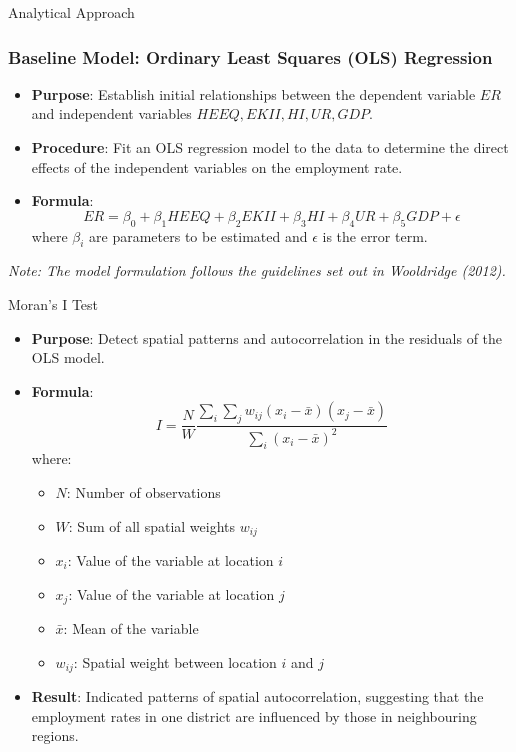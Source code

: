 \documentclass[10pt]{beamer}
\begin{document}
\begin{frame}{Analytical Approach}
\frametitle{Baseline Model: Ordinary Least Squares (OLS) Regression}
    \begin{itemize}
        \item \textbf{Purpose}: Establish initial relationships between the dependent variable \( ER \) and independent variables \( HEEQ, EKII, HI, UR, GDP \).
        \item \textbf{Procedure}: Fit an OLS regression model to the data to determine the direct effects of the independent variables on the employment rate.
        \item \textbf{Formula}:
        \begin{equation}
            ER = \beta_0 + \beta_1 HEEQ + \beta_2 EKII + \beta_3 HI + \beta_4 UR + \beta_5 GDP + \epsilon
        \end{equation}
        where \( \beta_i \) are parameters to be estimated and \( \epsilon \) is the error term.
    \end{itemize}
    \textit{Note: The model formulation follows the guidelines set out in Wooldridge (2012).}
\end{frame}


\begin{frame}{Moran's I Test \parencite{moran1950}}
    \begin{itemize}
        \item \textbf{Purpose}: Detect spatial patterns and autocorrelation in the residuals of the OLS model.
        \item \textbf{Formula}:
        \begin{equation}
            I = \frac{N}{W} \frac{\sum_{i} \sum_{j} w_{ij} (x_i - \bar{x})(x_j - \bar{x})}{\sum_{i} (x_i - \bar{x})^2}
        \end{equation}
        where:
        \begin{itemize}
            \item \(N\): Number of observations
            \item \(W\): Sum of all spatial weights \(w_{ij}\)
            \item \(x_i\): Value of the variable at location \(i\)
            \item \(x_j\): Value of the variable at location \(j\)
            \item \(\bar{x}\): Mean of the variable
            \item \(w_{ij}\): Spatial weight between location \(i\) and \(j\)
        \end{itemize}
        \item \textbf{Result}: Indicated patterns of spatial autocorrelation, suggesting that the employment rates in one district are influenced by those in neighbouring regions.
    \end{itemize}
\end{frame}
\end{document}
